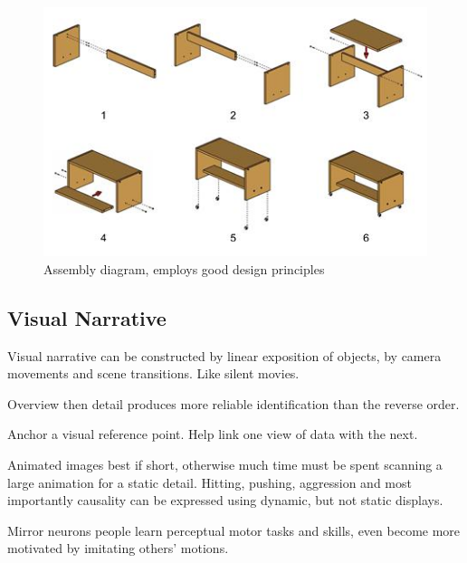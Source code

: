 \begin{mdframed}
\begin{multicols}{2}
\begin{figure}[H]\centering
    \includegraphics[width=0.8\linewidth]{assembly_diagram.png}
    \caption{Assembly diagram, employs good design principles}
\end{figure}
\end{multicols}\end{mdframed}


\begin{mdframed}\begin{multicols}{2}
\subsection{Visual Narrative}
\begin{compactdesc}
\item[Visual narrative] can be constructed by linear exposition of objects,
    by camera movements and scene transitions. Like silent movies.
\item[Overview then detail] produces more reliable identification than the
    reverse order.
\item[Anchor] a visual reference point. Help link one view of data with the
    next.
\item[Animated images] best if short, otherwise much time must be spent scanning
    a large animation for a static detail. Hitting, pushing, aggression and
    most importantly causality can be expressed using dynamic, but not static
    displays.
\item[Mirror neurons] people learn perceptual motor tasks and skills, even
    become more motivated by imitating others' motions.
\end{compactdesc}

\end{multicols}\end{mdframed}




